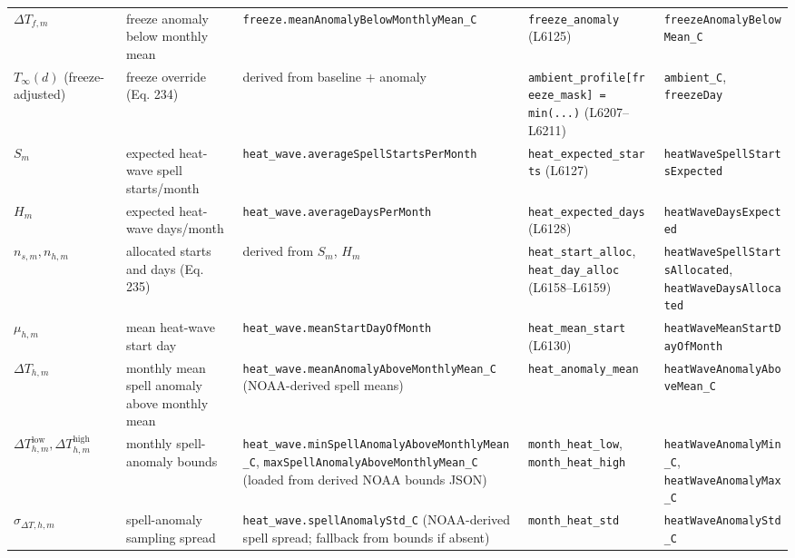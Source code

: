 \documentclass[11pt]{article}
\begin{document}
\begin{longtable}{p{}p{}p{}p{}p{}}
$\Delta T_{f,m}$ & freeze anomaly below monthly mean & \texttt{freeze.meanAnomalyBelowMonthlyMean\_C} & \texttt{freeze\_anomaly} (L6125) & \texttt{freezeAnomalyBelowMean\_C} \\

$T_\infty(d)$ (freeze-adjusted) & freeze override (Eq. 234) & derived from baseline + anomaly & \texttt{ambient\_profile[freeze\_mask] = min(...)} (L6207--L6211) & \texttt{ambient\_C}, \texttt{freezeDay} \\

$S_m$ & expected heat-wave spell starts/month & \texttt{heat\_wave.averageSpellStartsPerMonth} & \texttt{heat\_expected\_starts} (L6127) & \texttt{heatWaveSpellStartsExpected} \\

$H_m$ & expected heat-wave days/month & \texttt{heat\_wave.averageDaysPerMonth} & \texttt{heat\_expected\_days} (L6128) & \texttt{heatWaveDaysExpected} \\

$n_{s,m}, n_{h,m}$ & allocated starts and days (Eq. 235) & derived from $S_m$, $H_m$ & \texttt{heat\_start\_alloc}, \texttt{heat\_day\_alloc} (L6158--L6159) & \texttt{heatWaveSpellStartsAllocated}, \texttt{heatWaveDaysAllocated} \\

$\mu_{h,m}$ & mean heat-wave start day & \texttt{heat\_wave.meanStartDayOfMonth} & \texttt{heat\_mean\_start} (L6130) & \texttt{heatWaveMeanStartDayOfMonth} \\

$\Delta T_{h,m}$ & monthly mean spell anomaly above monthly mean & \texttt{heat\_wave.meanAnomalyAboveMonthlyMean\_C} (NOAA-derived spell means) & \texttt{heat\_anomaly\_mean} & \texttt{heatWaveAnomalyAboveMean\_C} \\

$\Delta T_{h,m}^{\mathrm{low}},\Delta T_{h,m}^{\mathrm{high}}$ & monthly spell-anomaly bounds & \texttt{heat\_wave.minSpellAnomalyAboveMonthlyMean\_C}, \texttt{maxSpellAnomalyAboveMonthlyMean\_C} (loaded from derived NOAA bounds JSON) & \texttt{month\_heat\_low}, \texttt{month\_heat\_high} & \texttt{heatWaveAnomalyMin\_C}, \texttt{heatWaveAnomalyMax\_C} \\

$\sigma_{\Delta T,h,m}$ & spell-anomaly sampling spread & \texttt{heat\_wave.spellAnomalyStd\_C} (NOAA-derived spell spread; fallback from bounds if absent) & \texttt{month\_heat\_std} & \texttt{heatWaveAnomalyStd\_C} \\


\end{longtable}
\end{document}
